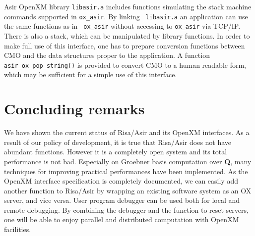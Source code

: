 \documentclass[runningheads]{cl2emult}
\begin{document}
Asir OpenXM library {\tt libasir.a} includes functions simulating the
stack machine commands supported in {\tt ox\_asir}.  By linking {\tt
libasir.a} an application can use the same functions as in {\tt
ox\_asir} without accessing to {\tt ox\_asir} via TCP/IP. There is
also a stack, which can be manipulated by library functions. In
order to make full use of this interface, one has to prepare
conversion functions between CMO and the data structures proper to the
application.  A function {\tt asir\_ox\_pop\_string()} is provided to
convert CMO to a human readable form, which may be sufficient for a
simple use of this interface.

\section{Concluding remarks}
We have shown the current status of Risa/Asir and its OpenXM
interfaces. As a result of our policy of development, it is true that
Risa/Asir does not have abundant functions. However it is a completely
open system and its total performance is not bad. Especially on
Groebner basis computation over {\bf Q}, many techniques for improving
practical performances have been implemented. As the OpenXM interface
specification is completely documented, we can easily add another
function to Risa/Asir by wrapping an existing software system as an OX
server, and vice versa. User program debugger can be used both for
local and remote debugging. By combining the debugger and the function
to reset servers, one will be able to enjoy parallel and distributed
computation with OpenXM facilities.
%
\end{document}
